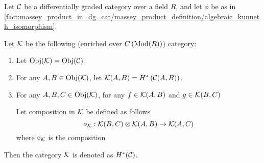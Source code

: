 \begin{definition}
    Let \( {\mathcal{C}} \) be a differentially graded category over a field \( R \), and let \( \phi \) be as in \autoref{fact:massey_product_in_dg_cat/massey_product_definition/algebraic_kunneth_isomorphism}.

    Let \( {\mathcal{K}} \) be the following (enriched over \( C\left( \operatorname{Mod}(R) \right) \)) category:
    \begin{enumerate}
        \item Let \( \operatorname{Obj}({\mathcal{K}}) = \operatorname{Obj}({\mathcal{C}}) \).
        \item For any \( A, B \in \operatorname{Obj}({\mathcal{K}}) \), let \( {\mathcal{K}}(A, B) = H^* \left( {\mathcal{C}}(A, B) \right) \).
        \item {
            For any \( A, B, C \in \operatorname{Obj}({\mathcal{K}}) \), for any \( f \in {\mathcal{K}}(A, B) \) and \( g \in {\mathcal{K}}(B, C) \)

            Let composition in \( {\mathcal{K}} \) be defined as follows
            \[
                \circ_{{\mathcal{K}}}: {\mathcal{K}}(B, C) \otimes {\mathcal{K}}(A, B) \to {\mathcal{K}}(A, C)
            \]
            where \( \circ_{{\mathcal{K}}} \) is the composition
            \begin{center}
            \end{center}
        }
    \end{enumerate}

    Then the category \( {\mathcal{K}} \) is denoted as \( H^*({\mathcal{C}}) \).
\end{definition}

